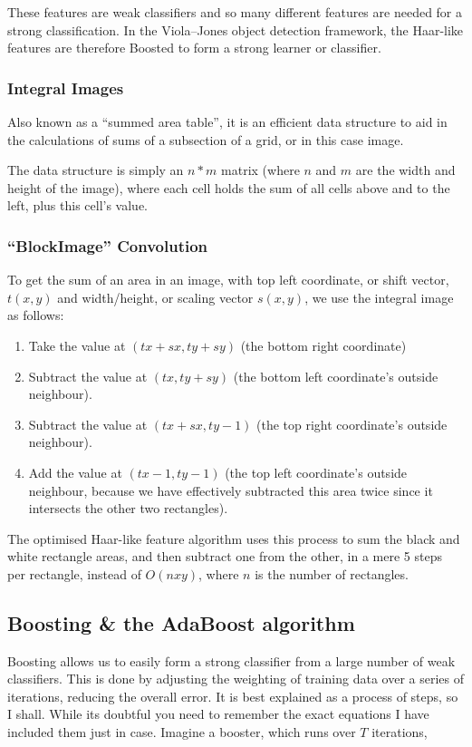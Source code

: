 \documentclass{article}
\begin{document}
            These features are weak classifiers and so many different features are needed for a strong classification. In the Viola–Jones object detection framework, the Haar-like features are therefore Boosted to form a strong learner or classifier.
            
        \subsubsection{Integral Images}
            Also known as a ``summed area table'', it is an efficient data structure to aid in the calculations of sums of a subsection of a grid, or in this case image.
            
            The data structure is simply an $n*m$ matrix (where $n$ and $m$ are the width and height of the image), where each cell holds the sum of all cells above and to the left, plus this cell's value.

        \subsubsection{``BlockImage'' Convolution}
            To get the sum of an area in an image, with top left coordinate, or shift vector, $t(x,y)$ and width/height, or scaling vector $s(x,y)$, we use the integral image as follows:
            
            \begin{enumerate}
                \item Take the value at $(tx+sx,ty+sy)$ (the bottom right coordinate)
                \item Subtract the value at $(tx,ty + sy)$ (the bottom left coordinate's outside neighbour).
                \item Subtract the value at $(tx + sx,ty-1)$ (the top right coordinate's outside neighbour).
                \item Add the value at $(tx-1,ty-1)$ (the top left coordinate's outside neighbour, because we have effectively subtracted this area twice since it intersects the other two rectangles).
            \end{enumerate}
            
            The optimised Haar-like feature algorithm uses this process to sum the black and white rectangle areas, and then subtract one from the other, in a mere 5 steps per rectangle, instead of $O(nxy)$, where $n$ is the number of rectangles.
                        
    \subsection{Boosting \& the AdaBoost algorithm}
        Boosting allows us to easily form a strong classifier from a large number of weak classifiers. This is done by adjusting the weighting of training data over a series of iterations, reducing the overall error. It is best explained as a process of steps, so I shall. While its doubtful you need to remember the exact equations I have included them just in case. Imagine a booster, which runs over $T$ iterations,
        
\end{document}
